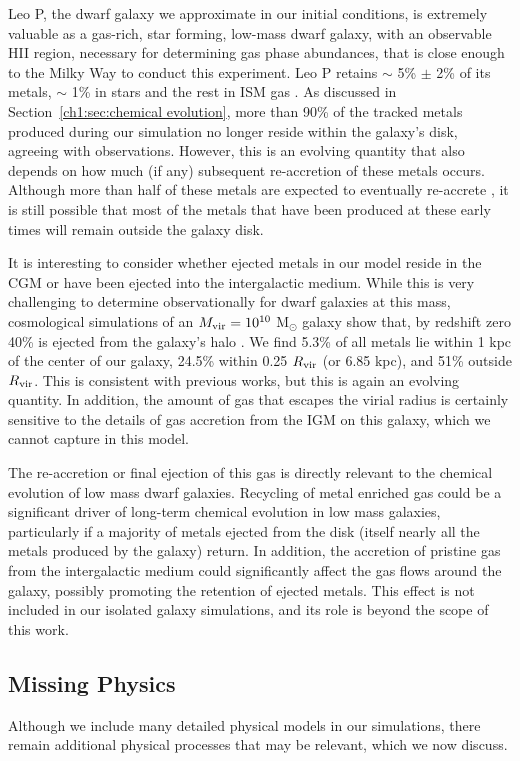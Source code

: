 Leo P, the dwarf galaxy we approximate in our initial conditions, is extremely valuable as a gas-rich, star forming, low-mass dwarf galaxy, with an observable HII region, necessary for determining gas phase abundances, that is close enough to the Milky Way to conduct this experiment. Leo P retains $\sim$ 5\% $\pm$ 2\% of its metals, $\sim$ 1\% in stars and the rest in ISM gas \citep{McQuinn2015}. As discussed in Section~\ref{ch1:sec:chemical evolution}, more than 90\% of the tracked metals produced during our simulation no longer reside within the galaxy's disk, agreeing with observations. However, this is an evolving quantity that also depends on how much (if any) subsequent re-accretion of these metals occurs. Although more than half of these metals are expected to eventually re-accrete \citep{Christensen2016,Christensen2018,Angles-Alcazar2017}, it is still possible that most of the metals that have been produced at these early times will remain outside the galaxy disk.

It is interesting to consider whether ejected metals in our model reside in the CGM or have been ejected into the intergalactic medium. While this is very challenging to determine observationally for dwarf galaxies at this mass, cosmological simulations of an $M_{\rm vir} = 10^{10}$ M$_{\odot}$ galaxy show that, by redshift zero 40\% is ejected from the galaxy's halo \citep{Angles-Alcazar2017}. We find 5.3\% of all metals lie within 1 kpc of the center of our galaxy, 24.5\% within 0.25 $R_{\rm vir}$ (or 6.85 kpc), and 51\% outside $R_{\rm vir}$. This is consistent with previous works, but this is again an evolving quantity. In addition, the amount of gas that escapes the virial radius is certainly sensitive to the details of gas accretion from the IGM on this galaxy, which we cannot capture in this model.

The re-accretion or final ejection of this gas is directly relevant to the chemical evolution of low mass dwarf galaxies. Recycling of metal enriched gas could be a significant driver of long-term chemical evolution in low mass galaxies, particularly if a majority of metals ejected from the disk (itself nearly all the metals produced by the galaxy) return. In addition, the accretion of pristine gas from the intergalactic medium could significantly affect the gas flows around the galaxy, possibly promoting the retention of ejected metals. This effect is not included in our isolated galaxy simulations, and its role is beyond the scope of this work.

\subsection{Missing Physics}
Although we include many detailed physical models in our simulations, there remain additional physical processes that may be relevant, which we now discuss.

